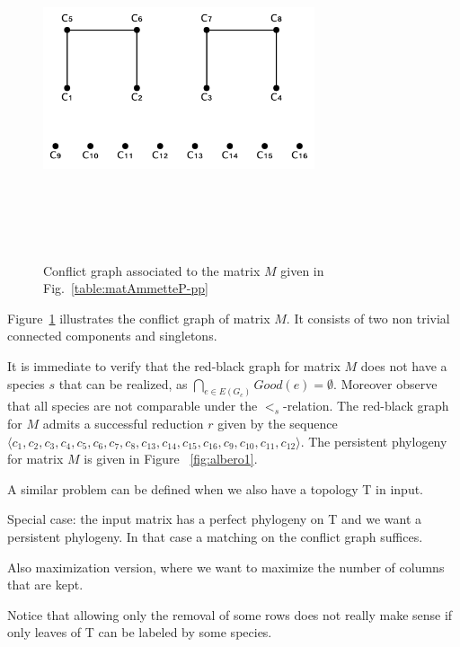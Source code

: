 \begin{figure}[htbp]
\centering
\includegraphics[height=10cm, width=8cm,keepaspectratio]{GrafoConflitti1}
\caption{Conflict graph associated to the matrix  $M$ given in Fig.~\ref{table:matAmmetteP-pp} }
\label{fig:GcM}
\end{figure}


Figure~\ref{fig:GcM} illustrates the conflict graph of matrix $M$. It consists
of two non trivial connected components and singletons.

It is immediate to verify that the red-black graph for matrix $M$ does not have
a species $s$ that can be realized, as  $\bigcap_{e \in E(G_c)}Good(e) =
\emptyset$.
Moreover observe that all species are not comparable under the $<_s$-relation.
The red-black graph  for $M$   admits a successful reduction   $r $ given by
the sequence $\langle c_1, c_2, c_3, c_4, c_5, c_6, c_7, c_8, c_{13}, c_{14},
c_{15}, c_{16}, c_9, c_{10}, c_{11}, c_{12} \rangle$.
The persistent phylogeny for matrix $M$ is given in Figure ~\ref{fig:albero1}.



A similar problem can be defined when we also have a topology T in input.

Special case: the input matrix has a perfect phylogeny on T and we want a persistent phylogeny. In that case a matching on the conflict graph suffices.

Also maximization version, where we want to maximize the number of columns that are kept.

Notice that allowing only the removal of some rows does not really make sense if only leaves of T can be labeled by some species.

